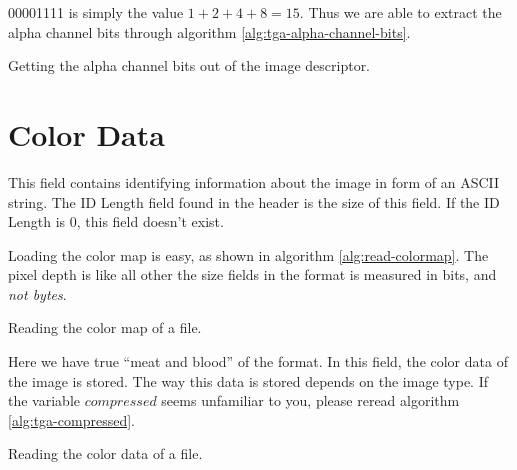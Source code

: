 \begin{refsection}
  00001111 is simply the value $1 + 2 + 4 + 8 = 15$. Thus we are able
  to extract the alpha channel bits through algorithm
  \ref{alg:tga-alpha-channel-bits}.

  \begin{algorithm}[H]
    \caption{Getting the alpha channel bits out of the image descriptor.}
    \label{alg:tga-alpha-channel-bits}
    \begin{algorithmic}[1]
    \end{algorithmic}
  \end{algorithm}

  \section{Color Data}
  \label{sec:color-data}


  This field contains identifying information about the image in form
  of an ASCII string. The ID Length field found in the header is the
  size of this field. If the ID Length is 0, this field doesn't
  exist.


  Loading the color map is easy, as shown in algorithm
  \ref{alg:read-colormap}. The pixel depth is like all other the size
  fields in the \tga format is measured in bits, and \textit{not bytes}.

  \begin{algorithm}[H]
    \caption{Reading the color map of a \tga file.}
    \label{alg:read-colormap}
    \begin{algorithmic}[1]
      \State {}
      \EndFor
    \end{algorithmic}
  \end{algorithm}


  Here we have true ``meat and blood'' of the \tga format. In this
  field, the color data of the image is stored. The way this data is
  stored depends on the image type. If the variable $compressed$ seems
  unfamiliar to you, please reread algorithm \ref{alg:tga-compressed}.

  \begin{algorithm}[H]
    \caption{Reading the color data of a \tga file.}
    \label{alg:TGA-read-colordata}
    \newcommand{\process}{\State Process the color $data$ \dots}
    \begin{algorithmic}[1]


\end{algorithmic}
\end{algorithm}
\end{refsection}
